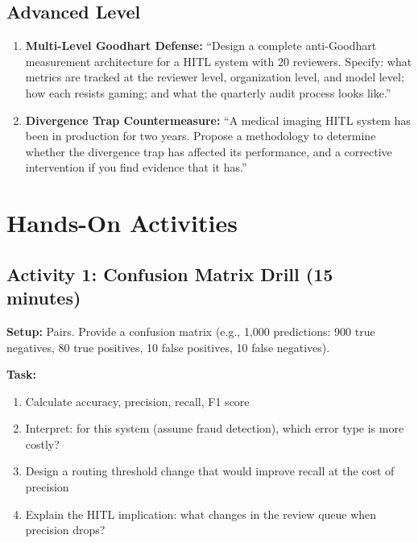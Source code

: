 \subsection{Advanced Level}

\begin{enumerate}
    \item \textbf{Multi-Level Goodhart Defense:} ``Design a complete anti-Goodhart measurement architecture for a HITL system with 20 reviewers. Specify: what metrics are tracked at the reviewer level, organization level, and model level; how each resists gaming; and what the quarterly audit process looks like.''

    \item \textbf{Divergence Trap Countermeasure:} ``A medical imaging HITL system has been in production for two years. Propose a methodology to determine whether the divergence trap has affected its performance, and a corrective intervention if you find evidence that it has.''
\end{enumerate}

\section{Hands-On Activities}

\subsection{Activity 1: Confusion Matrix Drill (15 minutes)}

\textbf{Setup:} Pairs. Provide a confusion matrix (e.g., 1,000 predictions: 900 true negatives, 80 true positives, 10 false positives, 10 false negatives).

\textbf{Task:}
\begin{enumerate}
    \item Calculate accuracy, precision, recall, F1 score
    \item Interpret: for this system (assume fraud detection), which error type is more costly?
    \item Design a routing threshold change that would improve recall at the cost of precision
    \item Explain the HITL implication: what changes in the review queue when precision drops?
\end{enumerate}

